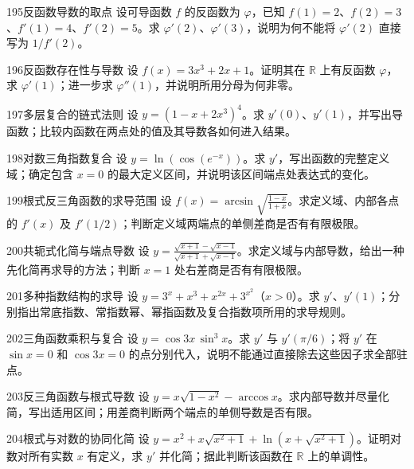 \begin{exercise}{195}{反函数导数的取点}
设可导函数 $f$ 的反函数为 $\varphi$，已知 $f(1)=2$、$f(2)=3$、$f'(1)=4$、$f'(2)=5$。求 $\varphi'(2)$、$\varphi'(3)$，说明为何不能将 $\varphi'(2)$ 直接写为 $1/f'(2)$。
\end{exercise}
\begin{exercise}{196}{反函数存在性与导数}
设 $f(x)=3x^3+2x+1$。证明其在 $\mathbb R$ 上有反函数 $\varphi$，求 $\varphi'(1)$；进一步求 $\varphi''(1)$，并说明所用分母为何非零。
\end{exercise}
\begin{exercise}{197}{多层复合的链式法则}
设 $y=(1-x+2x^3)^4$。求 $y'(0)$、$y'(1)$，并写出导函数；比较内函数在两点处的值及其导数各如何进入结果。
\end{exercise}
\begin{exercise}{198}{对数三角指数复合}
设 $y=\ln(\cos(e^{-x}))$。求 $y'$，写出函数的完整定义域；确定包含 $x=0$ 的最大定义区间，并说明该区间端点处表达式的变化。
\end{exercise}
\begin{exercise}{199}{根式反三角函数的求导范围}
设 $f(x)=\arcsin\sqrt{\frac{1-x}{1+x}}$。求定义域、内部各点的 $f'(x)$ 及 $f'(1/2)$；判断定义域两端点的单侧差商是否有有限极限。
\end{exercise}
\begin{exercise}{200}{共轭式化简与端点导数}
设 $y=\frac{\sqrt{x+1}-\sqrt{x-1}}{\sqrt{x+1}+\sqrt{x-1}}$。求定义域与内部导数，给出一种先化简再求导的方法；判断 $x=1$ 处右差商是否有有限极限。
\end{exercise}
\begin{exercise}{201}{多种指数结构的求导}
设 $y=3^x+x^3+x^{2x}+3^{x^2}$（$x>0$）。求 $y'$、$y'(1)$；分别指出常底指数、常指数幂、幂指函数及复合指数项所用的求导规则。
\end{exercise}
\begin{exercise}{202}{三角函数乘积与复合}
设 $y=\cos3x\,\sin^3x$。求 $y'$ 与 $y'(\pi/6)$；将 $y'$ 在 $\sin x=0$ 和 $\cos3x=0$ 的点分别代入，说明不能通过直接除去这些因子求全部驻点。
\end{exercise}
\begin{exercise}{203}{反三角函数与根式导数}
设 $y=x\sqrt{1-x^2}-\arccos x$。求内部导数并尽量化简，写出适用区间；用差商判断两个端点的单侧导数是否有限。
\end{exercise}
\begin{exercise}{204}{根式与对数的协同化简}
设 $y=x^2+x\sqrt{x^2+1}+\ln(x+\sqrt{x^2+1})$。证明对数对所有实数 $x$ 有定义，求 $y'$ 并化简；据此判断该函数在 $\mathbb R$ 上的单调性。
\end{exercise}
